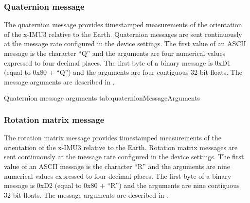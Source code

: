 \subsubsection{Quaternion message}

The quaternion message provides timestamped measurements of the orientation of the x-IMU3 relative to the Earth.  Quaternion messages are sent continuously at the message rate configured in the device settings.  The first value of an \ac{ASCII} message is the character \enquote{Q} and the arguments are four numerical values expressed to four decimal places.  The first byte of a binary message is 0xD1 (equal to 0x80 + \enquote{Q}) and the arguments are four contiguous 32-bit floats.  The message arguments are described in .

\begingroup
    \def\tempArgumentA{Quaternion W element}
    \def\tempArgumentB{Quaternion X element}
    \def\tempArgumentC{Quaternion Y element}
    \def\tempArgumentD{Quaternion Z element}
    \def\tempCaption{Quaternion message arguments}
    \def\tempLabel{tab:quaternionMessageArguments}
    \dataMessageTable
    {Quaternion message arguments}
    {tab:quaternionMessageArguments}
\endgroup

\begingroup
    \def\tempNameA{Quaternion W element}
    \def\tempNameB{Quaternion X element}
    \def\tempNameC{Quaternion Y element}
    \def\tempNameD{Quaternion Z element}
    \def\tempValueA{1}
    \def\tempValueB{0}
    \def\tempValueC{0}
    \def\tempValueD{0}
    \def\tempAsciiFirst{Q}
    \def\tempAsciiA{1.0000}
    \def\tempAsciiB{0.0000}
    \def\tempAsciiC{0.0000}
    \def\tempAsciiD{0.0000}
    \def\tempBinaryFirst{D1}
    \def\tempBinaryA{00 00 80 3F}
    \def\tempBinaryB{00 00 00 00}
    \def\tempBinaryC{00 00 00 00}
    \def\tempBinaryD{00 00 00 00}
    \dataMessageExample
\endgroup

\subsubsection{Rotation matrix message}

The rotation matrix message provides timestamped measurements of the orientation of the x-IMU3 relative to the Earth.  Rotation matrix messages are sent continuously at the message rate configured in the device settings.  The first value of an \ac{ASCII} message is the character \enquote{R} and the arguments are nine numerical values expressed to four decimal places.  The first byte of a binary message is 0xD2 (equal to 0x80 + \enquote{R}) and the arguments are nine contiguous 32-bit floats.  The message arguments are described in .

